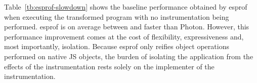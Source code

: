 Table~\ref{tb:esprof-slowdown} shows the baseline performance obtained by esprof when
executing the transformed program with no instrumentation being performed.
esprof is on average between  and  faster than Photon.
However, this performance improvement comes at the cost of flexibility,
expressiveness and, most importantly, isolation. Because esprof only reifies
object operations performed on native JS objects, the burden of isolating the
application from the effects of the instrumentation rests solely on the
implementer of the instrumentation.



